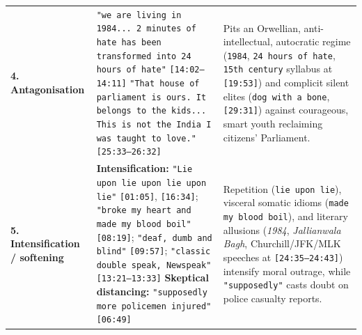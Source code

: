 \documentclass[10pt,a4paper]{article}
\begin{document}
\begin{longtable}{@{}>{\raggedright\arraybackslash}p{} >{\raggedright\arraybackslash}p{} >{\raggedright\arraybackslash}p{}@{}}
\addlinespace[4pt]
\textbf{4. Antagonisation} & \texttt{"we are living in 1984... 2 minutes of hate has been transformed into 24 hours of hate"} \texttt{[14:02--14:11]} \newline  \texttt{"That house of parliament is ours. It belongs to the kids... This is not the India I was taught to love."} \texttt{[25:33--26:32]} & Pits an Orwellian, anti-intellectual, autocratic regime (\texttt{1984}, \texttt{24 hours of hate}, \texttt{15th century} syllabus at \texttt{[19:53]}) and complicit silent elites (\texttt{dog with a bone}, \texttt{[29:31]}) against courageous, smart youth reclaiming citizens' Parliament. \\
\addlinespace[4pt]
\textbf{5. Intensification / softening} & \textbf{Intensification:} \texttt{"Lie upon lie upon lie upon lie"} \texttt{[01:05]}, \texttt{[16:34]}; \texttt{"broke my heart and made my blood boil"} \texttt{[08:19]}; \texttt{"deaf, dumb and blind"} \texttt{[09:57]}; \texttt{"classic double speak, Newspeak"} \texttt{[13:21--13:33]} \newline  \textbf{Skeptical distancing:} \texttt{"supposedly more policemen injured"} \texttt{[06:49]} & Repetition (\texttt{lie upon lie}), visceral somatic idioms (\texttt{made my blood boil}), and literary allusions (\textit{1984}, \textit{Jallianwala Bagh}, Churchill/JFK/MLK speeches at \texttt{[24:35--24:43]}) intensify moral outrage, while \texttt{"supposedly"} casts doubt on police casualty reports. \\
\bottomrule
\end{longtable}
\end{document}
